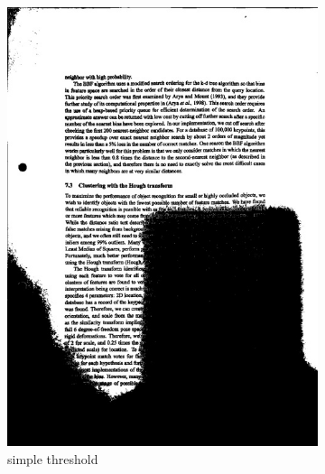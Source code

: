 \documentclass[bibliography=totoc]{scrartcl}
\begin{document}
\begin{figure}[H]
\begin{subfigure}[t]{0.28\linewidth}
		\includegraphics[width=\linewidth]{imgs/threshold/bad_lighting_simple.jpg}
		\caption{simple threshold}
		\label{subfig:simple_thresholding}
	\end{subfigure}
	\begin{subfigure}[t]{0.28\linewidth}

\end{subfigure}
\end{figure}
\end{document}
